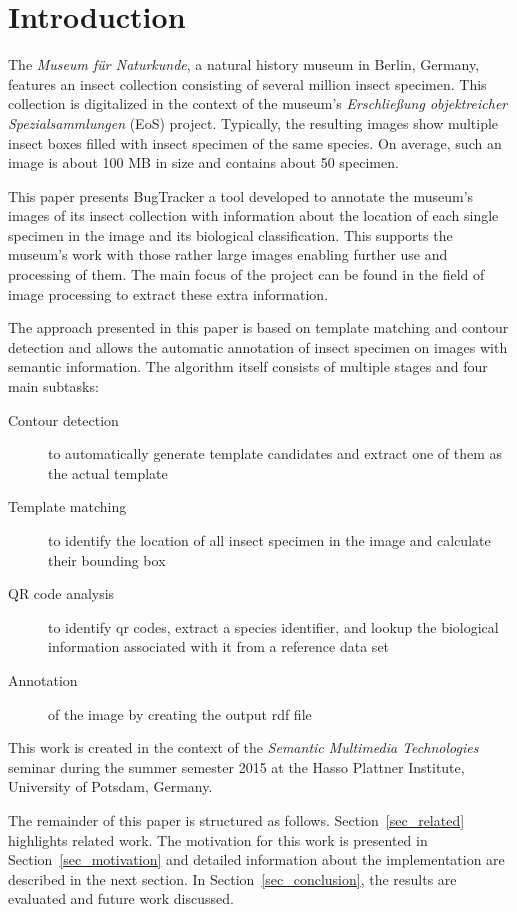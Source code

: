 \section{Introduction}
\label{sec_introduction}

The \emph{Museum für Naturkunde}, a natural history museum in Berlin, Germany, features an insect collection consisting of several million insect specimen.
This collection is digitalized in the context of the museum's \emph{Erschließung objektreicher Spezialsammlungen} (EoS) project.
Typically, the resulting images show multiple insect boxes filled with insect specimen of the same species.
On average, such an image is about 100 MB in size and contains about 50 specimen.

This paper presents BugTracker \textendash{} a tool developed to annotate the museum's images of its insect collection with information about the location of each single specimen in the image and its biological classification.
This supports the museum's work with those rather large images enabling further use and processing of them.
The main focus of the project can be found in the field of image processing to extract these extra information.

The approach presented in this paper is based on template matching and contour detection and allows the automatic annotation of insect specimen on images with semantic information.
The algorithm itself consists of multiple stages and four main subtasks:

\begin{description}
    \item[Contour detection] to automatically generate template candidates and extract one of them as the actual template
    \item[Template matching] to identify the location of all insect specimen in the image and calculate their bounding box
    \item[QR code analysis] to identify qr codes, extract a species identifier, and lookup the biological information associated with it from a reference data set
    \item[Annotation] of the image by creating the output rdf file
\end{description}

This work is created in the context of the \emph{Semantic Multimedia Technologies} seminar during the summer semester 2015 at the Hasso Plattner Institute, University of Potsdam, Germany.

The remainder of this paper is structured as follows. 
Section~\ref{sec_related} highlights related work.
The motivation for this work is presented in Section~\ref{sec_motivation} and detailed information about the implementation are described in the next section.
In Section~\ref{sec_conclusion}, the results are evaluated and future work discussed.
